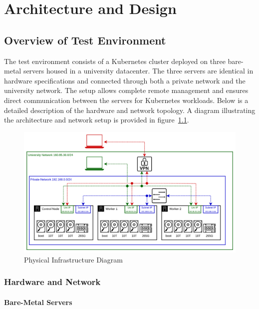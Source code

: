 
\chapter{Architecture and Design} %
\label{Chapter2}

\section{Overview of Test Environment}

The test environment consists of a Kubernetes cluster deployed on three bare-metal servers housed in a university datacenter. The three servers are identical in hardware specifications and connected through both a private network and the university network. The setup allows complete remote management and ensures direct communication between the servers for Kubernetes workloads. Below is a detailed description of the hardware and network topology. A diagram illustrating the architecture and network setup is provided in figure~\ref{fig:physical_and_network_infra}.

\begin{figure}[ht]
    \centering
    \includegraphics[width=1\textwidth]{Figures/physical_and_network_infra.png}
    \decoRule
    \caption[Physical Infrastructure Diagram]{Physical Infrastructure Diagram}
    \label{fig:physical_and_network_infra}
\end{figure}

\subsection{Hardware and Network}

\subsubsection{Bare-Metal Servers}

